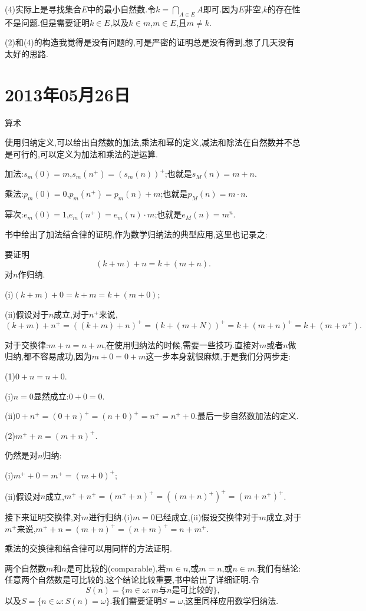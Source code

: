 \documentclass[12pt,a4paper,openany]{book}
\begin{document}
(4)实际上是寻找集合$E$中的最小自然数.令$k=\bigcap_{A \in E}{A}$即可.因为$E$非空,$k$的存在性不是问题.但是需要证明$k \in E$,以及$k \in m$,$m \in E$,且$m \neq k$.

(2)和(4)的构造我觉得是没有问题的,可是严密的证明总是没有得到,想了几天没有太好的思路.

\section{2013年05月26日}
算术

使用归纳定义,可以给出自然数的加法,乘法和幂的定义,减法和除法在自然数并不总是可行的,可以定义为加法和乘法的逆运算.

加法:$s_m(0)=m$,$s_m(n^+)=(s_m(n))^+$;也就是$s_M(n)=m+n$.

乘法:$p_m(0)=0$,$p_m(n^+)=p_m(n)+m$;也就是$p_M(n)=m \cdot n$.

幂次:$e_m(0)=1$,$e_m(n^+)=e_m(n) \cdot m$;也就是$e_M(n)=m^n$.

书中给出了加法结合律的证明,作为数学归纳法的典型应用,这里也记录之:

要证明
\[
(k+m)+n=k+(m+n).
\]
对$n$作归纳.

(i)$(k+m)+0=k+m=k+(m+0)$;

(ii)假设对于$n$成立,对于$n^+$来说,
\[
(k+m)+n^+ = ((k+m)+n)^+=(k+(m+N))^+=k+(m+n)^+=k+(m+n^+).
\]

对于交换律:$m+n=n+m$,在使用归纳法的时候,需要一些技巧.直接对$m$或者$n$做归纳,都不容易成功,因为$m+0=0+m$这一步本身就很麻烦,于是我们分两步走:

(1)$0+n=n+0$.

(i)$n=0$显然成立:$0+0=0$.

(ii)$0+n^+=(0+n)^+=(n+0)^+=n^+=n^++0$.最后一步自然数加法的定义.

(2)$m^++n=(m+n)^+$.

仍然是对$n$归纳:

(i)$m^++0=m^+=(m+0)^+$;

(ii)假设对$n$成立,$m^++n^+=(m^++n)^+=((m+n)^+)^+=(m+n^+)^+$.

接下来证明交换律,对$m$进行归纳.(i)$m=0$已经成立,(ii)假设交换律对于$m$成立,对于$m^+$来说,$m^++n=(m+n)^+=(n+m)^+=n+m^+$.

乘法的交换律和结合律可以用同样的方法证明.

两个自然数$m$和$n$是可比较的(comparable),若$m \in n$,或$m=n$,或$n \in m$.我们有结论:任意两个自然数是可比较的.这个结论比较重要,书中给出了详细证明.令
\[
S(n)=\{m \in \omega: m \text{与} n\text{是可比较的}\},
\]
以及$S = \{n \in \omega:S(n)=\omega\}$.我们需要证明$S=\omega$,这里同样应用数学归纳法.
\end{document}
